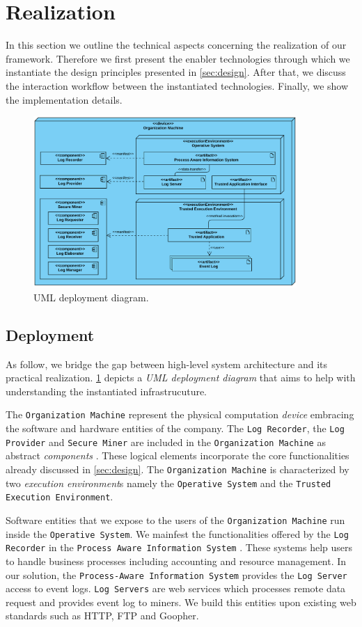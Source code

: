 \section{Realization}
In this section we outline the technical aspects concerning the realization of our framework. Therefore we first present the enabler technologies through which we instantiate the design principles presented in \cref{sec:design}. After that, we discuss the interaction workflow between the instantiated technologies. Finally, we show the implementation details.
\begin{figure}[t]
\centering
\includegraphics[width=10cm]{content/figures/deployment_diagram.pdf}
\caption{UML deployment diagram.}
\label{fig:deployment_diagram}
\end{figure}
\subsection{Deployment}
As follow, we bridge the gap between high-level system architecture and its practical realization. \cref{fig:deployment_diagram} depicts a \textit{UML deployment diagram} \cite{koch2002expressive} that aims to help with understanding the instantiated infrastrucuture. 

The \texttt{Organization Machine} represent the physical computation \textit{device} embracing the software and hardware entities of the company. The \texttt{Log Recorder}, the \texttt{Log Provider} and \texttt{Secure Miner} are included in the \texttt{Organization Machine} as abstract \textit{components} . These logical elements incorporate the core functionalities already discussed in \cref{sec:design}. The \texttt{Organization Machine} is characterized by two \textit{execution environment}s namely the \texttt{Operative System} and the \texttt{Trusted Execution Environment}.

Software entities that we expose to the users of the \texttt{Organization Machine} run inside the \texttt{Operative System}. We mainfest the functionalities offered by the \texttt{Log Recorder} in the \texttt{Process Aware Information System}  \cite{Dumas.etal/2018:FundamentalsofBPM}. These systems help users to handle business processes including accounting and resource management. In our solution, the \texttt{Process-Aware Information System} provides the \texttt{Log Server} access to event logs. \texttt{Log Servers} are web services which processes remote data request and provides event log to miners. We build this entities upon existing web standards such as HTTP, FTP and Goopher.

